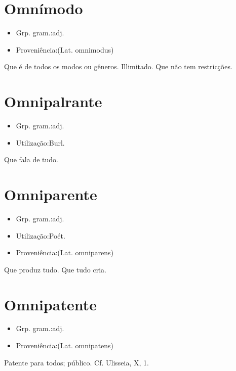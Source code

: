 \section{Omnímodo}
\begin{itemize}
\item {Grp. gram.:adj.}
\end{itemize}
\begin{itemize}
\item {Proveniência:(Lat. \textunderscore omnimodus\textunderscore )}
\end{itemize}
Que é de todos os modos ou gêneros.
Illimitado.
Que não tem restricções.
\section{Omnipalrante}
\begin{itemize}
\item {Grp. gram.:adj.}
\end{itemize}
\begin{itemize}
\item {Utilização:Burl.}
\end{itemize}
Que fala de tudo.
\section{Omniparente}
\begin{itemize}
\item {Grp. gram.:adj.}
\end{itemize}
\begin{itemize}
\item {Utilização:Poét.}
\end{itemize}
\begin{itemize}
\item {Proveniência:(Lat. \textunderscore omniparens\textunderscore )}
\end{itemize}
Que produz tudo.
Que tudo cria.
\section{Omnipatente}
\begin{itemize}
\item {Grp. gram.:adj.}
\end{itemize}
\begin{itemize}
\item {Proveniência:(Lat. \textunderscore omnipatens\textunderscore )}
\end{itemize}
Patente para todos; público. Cf. \textunderscore Ulisseia\textunderscore , X, 1.
